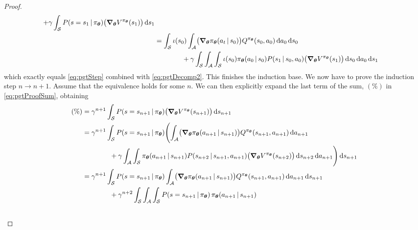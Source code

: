 \begin{proof}
\begin{align}
				+ \gamma \int_\mathcal{S} P(s = s_1 \,\vert\, \pi_{\bm{\theta}}) \bigl( \grad_{\bm{\theta}} V^{\pi_{\bm{\theta}}}(s_1) \bigr) \dd{s_1}                                                                                             \\
				 & = \int_{\mathcal{S}} \iota(s_0) \int_{\mathcal{A}} \bigl( \grad_{\bm{\theta}} \pi_{\bm{\theta}}(a_t \,\vert\, s_0) \bigr) Q^{\pi_{\bm{\theta}}}(s_0, a_0) \dd{a_0} \dd{s_0}                                                     \\&\qquad\qquad
				+ \gamma \int_\mathcal{S} \int_\mathcal{A} \int_\mathcal{S} \iota(s_0) \pi_{\bm{\theta}}(a_0 \,\vert\, s_0) P(s_1 \,\vert\, s_0, a_0) \bigl( \grad_{\bm{\theta}} V^{\pi_{\bm{\theta}}}(s_1) \bigr) \dd{s_0} \dd{a_0} \dd{s_1}
			\end{align}
			which exactly equals \eqref{eq:pgtStep} combined with \eqref{eq:pgtDecomp2}. This finishes the induction base. We now have to prove the induction step \( n \to n + 1 \). Assume that the equivalence holds for some \(n\). We can then explicitly expand the last term of the sum, \((\%)\) in \eqref{eq:pgtProofSum}, obtaining
			\begin{align}
				(\%)
				 & = \gamma^{n + 1} \int_\mathcal{S} P(s = s_{n + 1} \given \pi_{\vec{\theta}}) \bigl( \grad_{\vec{\theta}} V^{\pi_{\vec{\theta}}}(s_{n + 1}) \bigr) \dd{s_{n + 1}}                                                                                           \\
				 & = \gamma^{n + 1} \int_\mathcal{S} P(s = s_{n + 1} \given \pi_{\vec{\theta}}) \Biggl( \int_\mathcal{A} \bigl( \grad_{\vec{\theta}} \pi_{\vec{\theta}}(a_{n + 1} \given s_{n + 1}) \bigr) Q^{\pi_{\vec{\theta}}}(s_{n + 1}, a_{n + 1}) \dd{a_{n + 1}}        \\&\qquad\qquad
				+ \gamma \int_\mathcal{A} \int_\mathcal{S} \pi_{\vec{\theta}}(a_{n + 1} \given s_{n + 1}) P(s_{n + 2} \given s_{n + 1}, a_{n + 1}) \bigl( \grad_{\vec{\theta}} V^{\pi_{\vec{\theta}}}(s_{n + 2}) \bigr) \dd{s_{n + 2}} \dd{a_{n + 1}} \Biggr) \dd{s_{n + 1}}  \\
				 & = \gamma^{n + 1} \int_\mathcal{S} P(s = s_{n + 1} \given \pi_{\vec{\theta}}) \int_\mathcal{A} \bigl( \grad_{\vec{\theta}} \pi_{\vec{\theta}}(a_{n + 1} \given s_{n + 1}) \bigr) Q^{\pi_{\vec{\theta}}}(s_{n + 1}, a_{n + 1}) \dd{a_{n + 1}} \dd{s_{n + 1}} \\&\qquad\qquad
				+ \gamma^{n + 2} \int_\mathcal{S} \int_\mathcal{A} \int_\mathcal{S} P(s = s_{n + 1} \given \pi_{\vec{\theta}}) \, \pi_{\vec{\theta}}(a_{n + 1} \given s_{n + 1})                                                                                              \\&\qquad\qquad\qquad\qquad

\end{align}
\end{proof}

